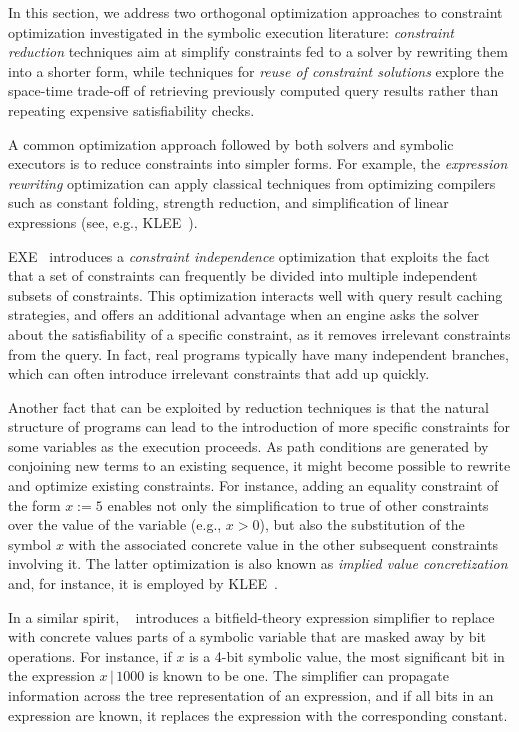 In this section, we address two orthogonal optimization approaches to constraint optimization investigated in the symbolic execution literature: {\em constraint reduction} techniques aim at simplify constraints fed to a solver by rewriting them into a shorter form, while techniques for {\em reuse of constraint solutions} explore the space-time trade-off of retrieving previously computed query results rather than repeating expensive satisfiability checks.

A common optimization approach followed by both solvers and symbolic executors is to reduce constraints into simpler forms. For example, the {\em expression rewriting} optimization can apply classical techniques from optimizing compilers such as constant folding, strength reduction, and simplification of linear expressions (see, e.g., {\sc KLEE}~\cite{KLEE-OSDI08}).

{\sc EXE}~\cite{EXE-CCS06} introduces a {\em constraint independence} optimization that exploits the fact that a set of constraints can frequently be divided into multiple independent subsets of constraints. This optimization interacts well with query result caching strategies, and offers an additional advantage when an engine asks the solver about the satisfiability of a specific constraint, as it removes irrelevant constraints from the query. In fact, real programs typically have many independent branches, which can often introduce irrelevant constraints that add up quickly.

Another fact that can be exploited by reduction techniques is that the natural structure of programs can lead to the introduction of more specific constraints for some variables as the execution proceeds. As path conditions are generated by conjoining new terms to an existing sequence, it might become possible to rewrite and optimize existing constraints. For instance, adding an equality constraint of the form $x:=5$ enables not only the simplification to true of other constraints over the value of the variable (e.g., $x>0$), but also the substitution of the symbol $x$ with the associated concrete value in the other subsequent constraints involving it. The latter optimization is also known as {\em implied value concretization} and, for instance, it is employed by {\sc KLEE}~\cite{KLEE-OSDI08}.

In a similar spirit, {\sc \stwoe}~\cite{CKC-TOCS12} introduces a bitfield-theory expression simplifier to replace with concrete values parts of a symbolic variable that are masked away by bit operations. For instance, if $x$ is a 4-bit symbolic value, the most significant bit in the expression $x\,|\,1000$ is known to be one. The simplifier can propagate information across the tree representation of an expression, and if all bits in an expression are known, it replaces the expression with the corresponding constant.
 
